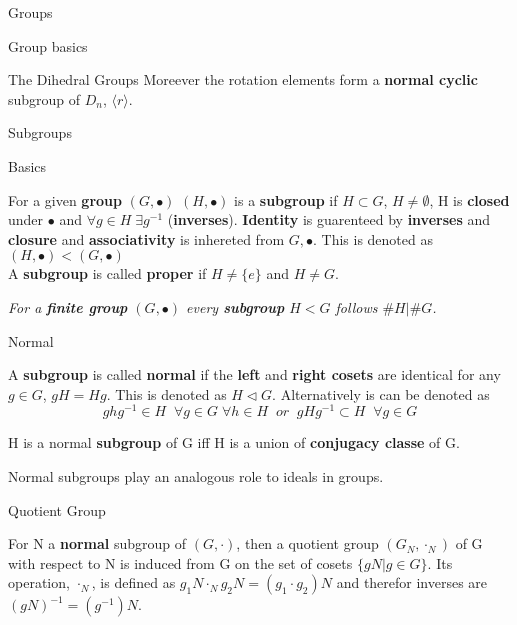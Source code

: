 \documentclass[12pt, letterpaper]{article}
\begin{document}
\begin{section}{Groups}
\begin{subsection}{Group basics}
\begin{subsubsection}{The Dihedral Groups}
      Moreever the rotation elements form a \textbf{normal cyclic} subgroup of \(D_{n}\),
      \(\langle r \rangle\).

    \end{subsubsection}

  \end{subsection}

  \begin{subsection}{Subgroups}

    \begin{subsubsection}{Basics}

      For a given \textbf{group} \((G, \bullet)\) \((H, \bullet)\) is a \textbf{subgroup}
      if \(H \subset G\), \(H \neq \emptyset\), H is \textbf{closed} under \(\bullet\)
      and \(\forall g \in H \; \exists g^{-1}\) (\textbf{inverses}). \textbf{Identity}
      is guarenteed by \textbf{inverses} and \textbf{closure} and \textbf{associativity}
      is inhereted from \(G, \bullet\). This is denoted as \((H, \bullet) < (G, \bullet)\) \\
      A \textbf{subgroup} is called \textbf{proper} if \(H \neq \{{} e \}{}\) and
      \(H \neq G\).

      \emph{For a \textbf{finite group} \((G, \bullet)\) every \textbf{subgroup}
        \(H < G\) follows \(\#H|\#G\).}

    \end{subsubsection}

    \begin{subsubsection}{Normal}

      A \textbf{subgroup} is called \textbf{normal} if the \textbf{left} and
      \textbf{right cosets} are identical for any \(g \in G\), \(gH = Hg\).
      This is denoted as \(H \triangleleft G\). Alternatively is can be denoted as
      \[ghg^{-1} \in H \;\; \forall g \in G \; \forall h \in H \;\;
        or \;\; gHg^{-1} \subset H \;\; \forall g \in G\]

      H is a normal \textbf{subgroup} of G iff H is a union of \textbf{conjugacy classe}
      of G.

      Normal subgroups play an analogous role to ideals in groups.

    \end{subsubsection}

    \begin{subsubsection}{Quotient Group}

      For N a \textbf{normal} subgroup of \((G, \cdot)\), then a quotient group
      \((G_{N}, \cdot_{N})\) of G with respect to N is induced from G on the set
      of cosets \(\{ gN | g \in G \}\). Its operation, \(\cdot_{N}\), is defined as
      \(g_{1}N \cdot_{N} g_{2}N = (g_{1} \cdot g_{2})N\) and therefor inverses are
      \((gN)^{-1} = (g^{-1})N\).


\end{subsubsection}
\end{subsection}
\end{section}
\end{document}
